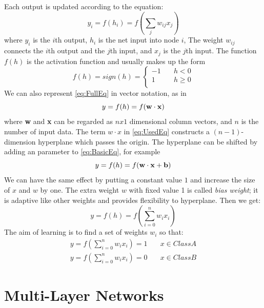 Each output is updated according to the equation:
\begin{equation}\label{eq:BasicEq}
y_{i} = f(h_{i}) = f\left(\sum_{j}w_{ij}x_{j}\right)
\end{equation}
where $y_{i}$ is the $i$th output, $h_{i}$ is the net input into node $i$, The weight $w_{ij}$ connects the $i$th output and the $j$th input, and $x_{j}$ is the $j$th input. The function $f(h)$ is the activation function and usually makes up the form
\begin{equation}\label{eq:FullEq}
f(h) = sign(h) = 
  \begin{cases}
    -1       & \quad h < 0 \\
    1  & \quad h \geq 0\\
  \end{cases}
\end{equation}
We can also represent \ref{eq:FullEq} in vector notation, as in 
\begin{equation}\label{eq:UsedEq}
y = f(h) = f(\bf w \cdot x)
\end{equation}
where \textbf{w} and \textbf{x} can be regarded as $nx1$ dimensional column vectors, and $n$ is the number of input data.
The term $w \cdot x$ in \ref{eq:UsedEq} constructs a $(n-1)$-dimension hyperplane which passes the origin. The hyperplane can be shifted by adding an parameter to \ref{eq:BasicEq}, for example
\begin{equation}\label{eq:WithBias}
y = f(h) = f(\bf w \cdot x + b)
\end{equation}
We can have the same effect by putting a constant value $1$ and increase the size of $x$ and $w$ by one. The extra weight $w$ with fixed value 1 is called \textit{bias weight}; it is adaptive like other weights and provides flexibility to hyperplane. Then we get:
\begin{equation}\label{eq:finalEq}
y = f(h) = f(\sum_{i=0}^{n}w_{i}x_{i})
\end{equation}
The aim of learning is to find a set of weights $w_{i}$ so that:
\begin{align*}
y = f(\sum_{i=0}^{n}w_{i}x_{i}) = 1  & \quad x \in Class A\\
y = f(\sum_{i=0}^{n}w_{i}x_{i}) = 0  & \quad x \in Class B
\end{align*}


\section{Multi-Layer Networks}


